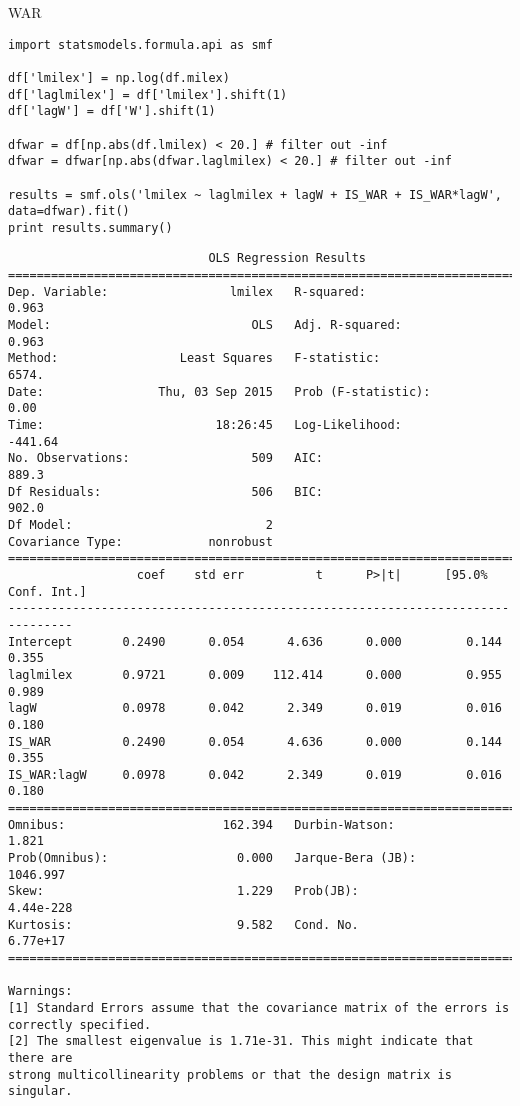 \documentclass[12pt,fleqn]{article}\usepackage{common}
\begin{document}

WAR

\begin{verbatim}
import statsmodels.formula.api as smf

df['lmilex'] = np.log(df.milex)
df['laglmilex'] = df['lmilex'].shift(1)
df['lagW'] = df['W'].shift(1)

dfwar = df[np.abs(df.lmilex) < 20.] # filter out -inf
dfwar = dfwar[np.abs(dfwar.laglmilex) < 20.] # filter out -inf

results = smf.ols('lmilex ~ laglmilex + lagW + IS_WAR + IS_WAR*lagW', data=dfwar).fit()
print results.summary()
\end{verbatim}

\begin{verbatim}
                            OLS Regression Results                            
==============================================================================
Dep. Variable:                 lmilex   R-squared:                       0.963
Model:                            OLS   Adj. R-squared:                  0.963
Method:                 Least Squares   F-statistic:                     6574.
Date:                Thu, 03 Sep 2015   Prob (F-statistic):               0.00
Time:                        18:26:45   Log-Likelihood:                -441.64
No. Observations:                 509   AIC:                             889.3
Df Residuals:                     506   BIC:                             902.0
Df Model:                           2                                         
Covariance Type:            nonrobust                                         
===============================================================================
                  coef    std err          t      P>|t|      [95.0% Conf. Int.]
-------------------------------------------------------------------------------
Intercept       0.2490      0.054      4.636      0.000         0.144     0.355
laglmilex       0.9721      0.009    112.414      0.000         0.955     0.989
lagW            0.0978      0.042      2.349      0.019         0.016     0.180
IS_WAR          0.2490      0.054      4.636      0.000         0.144     0.355
IS_WAR:lagW     0.0978      0.042      2.349      0.019         0.016     0.180
==============================================================================
Omnibus:                      162.394   Durbin-Watson:                   1.821
Prob(Omnibus):                  0.000   Jarque-Bera (JB):             1046.997
Skew:                           1.229   Prob(JB):                    4.44e-228
Kurtosis:                       9.582   Cond. No.                     6.77e+17
==============================================================================

Warnings:
[1] Standard Errors assume that the covariance matrix of the errors is correctly specified.
[2] The smallest eigenvalue is 1.71e-31. This might indicate that there are
strong multicollinearity problems or that the design matrix is singular.
\end{verbatim}
\end{document}
